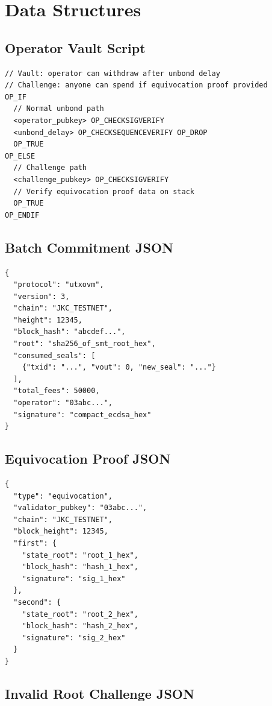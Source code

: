 \documentclass[a4paper,11pt]{article}
\begin{document}
\section{Data Structures}

\subsection{Operator Vault Script}

\begin{lstlisting}[style=script]
// Vault: operator can withdraw after unbond delay
// Challenge: anyone can spend if equivocation proof provided
OP_IF
  // Normal unbond path
  <operator_pubkey> OP_CHECKSIGVERIFY
  <unbond_delay> OP_CHECKSEQUENCEVERIFY OP_DROP
  OP_TRUE
OP_ELSE
  // Challenge path
  <challenge_pubkey> OP_CHECKSIGVERIFY
  // Verify equivocation proof data on stack
  OP_TRUE
OP_ENDIF
\end{lstlisting}

\subsection{Batch Commitment JSON}

\begin{lstlisting}[style=script]
{
  "protocol": "utxovm",
  "version": 3,
  "chain": "JKC_TESTNET",
  "height": 12345,
  "block_hash": "abcdef...",
  "root": "sha256_of_smt_root_hex",
  "consumed_seals": [
    {"txid": "...", "vout": 0, "new_seal": "..."}
  ],
  "total_fees": 50000,
  "operator": "03abc...",
  "signature": "compact_ecdsa_hex"
}
\end{lstlisting}

\subsection{Equivocation Proof JSON}

\begin{lstlisting}[style=script]
{
  "type": "equivocation",
  "validator_pubkey": "03abc...",
  "chain": "JKC_TESTNET",
  "block_height": 12345,
  "first": {
    "state_root": "root_1_hex",
    "block_hash": "hash_1_hex",
    "signature": "sig_1_hex"
  },
  "second": {
    "state_root": "root_2_hex",
    "block_hash": "hash_2_hex",
    "signature": "sig_2_hex"
  }
}
\end{lstlisting}

\subsection{Invalid Root Challenge JSON}
\end{document}
